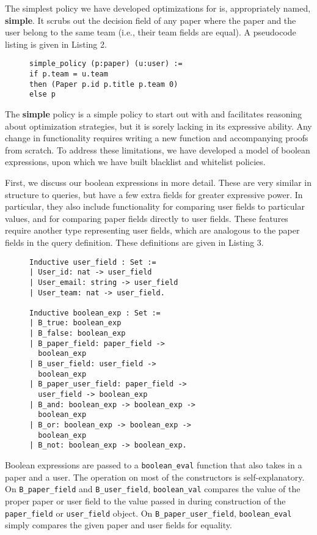 \documentclass[11pt,journal]{IEEEtran}
\begin{document}
The simplest policy we have developed optimizations for is, appropriately named, \textbf{simple}.  It scrubs out the decision field of any paper where the paper and the user belong to the same team (i.e., their team fields are equal).  A pseudocode listing is given in Listing 2.
\begin{figure}
\begin{lstlisting}[caption=The \textbf{simple} policy.]
simple_policy (p:paper) (u:user) :=
if p.team = u.team
then (Paper p.id p.title p.team 0)
else p
\end{lstlisting}
\end{figure}
The \textbf{simple} policy is a simple policy to start out with and facilitates reasoning about optimization strategies, but it is sorely lacking in its expressive ability.  Any change in functionality requires writing a new function and accompanying proofs from scratch.  To address these limitations, we have developed a model of boolean expressions, upon which we have built blacklist and whitelist policies.

First, we discuss our boolean expressions in more detail.  These are very similar in structure to queries, but have a few extra fields for greater expressive power.  In particular, they also include functionality for comparing user fields to particular values, and for comparing paper fields directly to user fields.  These features require another type representing user fields, which are analogous to the paper fields in the query definition.  These definitions are given in Listing 3.
\begin{figure}
\begin{lstlisting}[caption=Boolean expressions.]
Inductive user_field : Set :=
| User_id: nat -> user_field
| User_email: string -> user_field
| User_team: nat -> user_field.

Inductive boolean_exp : Set :=
| B_true: boolean_exp
| B_false: boolean_exp
| B_paper_field: paper_field ->
  boolean_exp
| B_user_field: user_field ->
  boolean_exp
| B_paper_user_field: paper_field ->
  user_field -> boolean_exp
| B_and: boolean_exp -> boolean_exp ->
  boolean_exp
| B_or: boolean_exp -> boolean_exp ->
  boolean_exp
| B_not: boolean_exp -> boolean_exp.
\end{lstlisting}
\end{figure}
Boolean expressions are passed to a \texttt{boolean\_eval} function that also takes in a paper and a user.  The operation on most of the constructors is self-explanatory.  On \texttt{B\_paper\_field} and \texttt{B\_user\_field}, \texttt{boolean\_val} compares the value of the proper paper or user field to the value passed in during construction of the \texttt{paper\_field} or \texttt{user\_field} object.  On \texttt{B\_paper\_user\_field}, \texttt{boolean\_eval} simply compares the given paper and user fields for equality.
\end{document}
